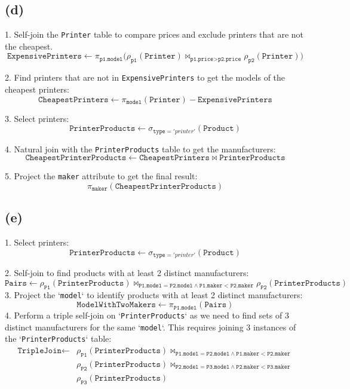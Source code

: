 \documentclass{article}
\begin{document}
\newpage
\subsection*{(d)}
1. Self-join the \texttt{Printer} table to compare prices and exclude printers that are not the cheapest.
$$
    \texttt{ExpensivePrinters} \leftarrow \pi_{\texttt{p1.model}} \Big(
    \rho_{\texttt{p1}}(\texttt{Printer}) \bowtie_{\texttt{p1.price} > \texttt{p2.price}} \rho_{\texttt{p2}}(\texttt{Printer})
    \Big)
$$

2. Find printers that are not in \texttt{ExpensivePrinters} to get the models of the cheapest printers:
$$
    \texttt{CheapestPrinters} \leftarrow \pi_{\texttt{model}}(\texttt{Printer}) - \texttt{ExpensivePrinters}
$$

3. Select printers:
$$
    \texttt{PrinterProducts} \leftarrow \sigma_{\texttt{type} = 'printer'}(\texttt{Product})
$$

4. Natural join with the \texttt{PrinterProducts} table to get the manufacturers:
$$
    \texttt{CheapestPrinterProducts} \leftarrow \texttt{CheapestPrinters} \bowtie \texttt{PrinterProducts}
$$

5. Project the \texttt{maker} attribute to get the final result:
$$
    \pi_{\texttt{maker}}(\texttt{CheapestPrinterProducts})
$$

\subsection*{(e)}
1. Select printers:
$$
    \texttt{PrinterProducts} \leftarrow \sigma_{\texttt{type} = 'printer'}(\texttt{Product})
$$

2. Self-join to find products with at least 2 distinct manufacturers:
$$
    \texttt{Pairs} \leftarrow \rho_{\texttt{P1}}(\texttt{PrinterProducts}) \bowtie_{\texttt{P1.model} = \texttt{P2.model} \land \texttt{P1.maker} < \texttt{P2.maker}} \rho_{\texttt{P2}}(\texttt{PrinterProducts})
$$
3. Project the `\texttt{model}` to identify products with at least 2 distinct manufacturers:
$$
    \texttt{ModelWithTwoMakers} \leftarrow \pi_{\texttt{P1.model}}(\texttt{Pairs})
$$
4. Perform a triple self-join on `\texttt{PrinterProducts}` as we need to find sets of 3 distinct manufacturers for the same `\texttt{model}`. This requires joining 3 instances of the `\texttt{PrinterProducts}` table:
$$
    \begin{aligned}
        \texttt{TripleJoin} \leftarrow
         & \rho_{\texttt{P1}}(\texttt{PrinterProducts})
        \bowtie_{\texttt{P1.model} = \texttt{P2.model} \land \texttt{P1.maker} < \texttt{P2.maker}} \\
         & \rho_{\texttt{P2}}(\texttt{PrinterProducts})
        \bowtie_{\texttt{P2.model} = \texttt{P3.model} \land \texttt{P2.maker} < \texttt{P3.maker}} \\
         & \rho_{\texttt{P3}}(\texttt{PrinterProducts})
    \end{aligned}
$$
\end{document}
